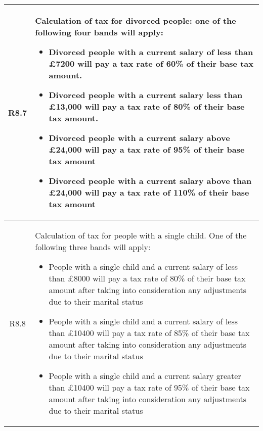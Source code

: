 \begin{table}[H]
\begin{tabularx}{\textwidth}{| c | X |}
    \hline %
    \label{req:r8-7}
    R8.7 & Calculation of tax for divorced people: one of the following four bands will apply:
    \begin{itemize}[itemsep=\tableitemsep, leftmargin=\tableleftsep]
        \item Divorced people with a current salary of less than £7200 will pay a tax rate
        of 60\% of their base tax amount.
        \item Divorced people with a current salary less than £13,000 will pay a tax rate of
        80\% of their base tax amount.
        \item Divorced people with a current salary above £24,000 will pay a tax rate of
        95\% of their base tax amount
        \item Divorced people with a current salary above than £24,000 will pay a tax rate
        of 110\% of their base tax amount
    \end{itemize}
    \\
    \hline %
    \label{req:r8-8}
    R8.8 & Calculation of tax for people with a single child. One of the following three bands will apply:
    \begin{itemize}[itemsep=\tableitemsep, leftmargin=\tableleftsep]
        \item People with a single child and a current salary of less than £8000 will pay a tax rate of 80\% of their base tax amount after taking into consideration any
        adjustments due to their marital status
        \item People with a single child and a current salary of less than £10400 will pay a
        tax rate of 85\% of their base tax amount after taking into consideration any
        adjustments due to their marital status
        \item People with a single child and a current salary greater than £10400 will pay a
        tax rate of 95\% of their base tax amount after taking into consideration any adjustments due to their marital status
    \end{itemize}
    \\
    \hline %
\end{tabularx}
\end{table}

